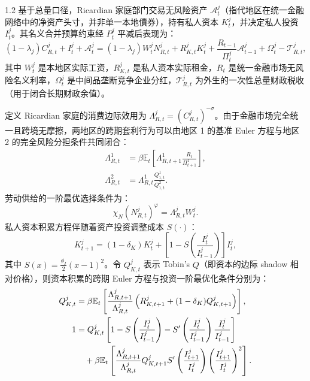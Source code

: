 \documentclass[12pt,UTF8]{ctexart}
\newcommand{\E}{\mathbb{E}}
\begin{document}
\begin{spacing}{1.2}
		基于总量口径，Ricardian 家庭部门交易无风险资产 $\mathcal A_t^j$（指代地区在统一金融网络中的净资产头寸，并非单一本地債券），持有私人资本 $K_t^j$，并决定私人投资 $I_t^j$。其名义合并预算约束经 $P_t^j$ 平减后表现为：
		\begin{equation}
			(1-\lambda_j)C_{R,t}^j+I_t^j+\mathcal A_t^j
			=
			(1-\lambda_j)W_t^jN_{R,t}^j+R_{K,t}^jK_t^j
			+\frac{R_{t-1}}{\Pi_t^j}\mathcal A_{t-1}^j
			+\Omega_t^j-\mathcal T_{R,t}^j,
			\label{eq:budget_R}
		\end{equation}
		其中 $W_t^j$ 是本地区实际工资，$R_{K,t}^j$ 是私人资本实际租金，$R_t$ 是统一金融市场无风险名义利率，$\Omega_t^j$ 是中间品垄断竞争企业分红，$\mathcal T_{R,t}^j$ 为外生的一次性总量财政税收（用于闭合长期财政余值）。
		
		定义 Ricardian 家庭的消费边际效用为 $\Lambda_{R,t}^j=(C_{R,t}^j)^{-\sigma}$。由于金融市场完全统一且跨境无摩擦，两地区的跨期套利行为可以由地区 1 的基准 Euler 方程与地区 2 的完全风险分担条件共同闭合：
		\begin{align}
			\Lambda_{R,t}^1 &=\beta \E_t\left[\Lambda_{R,t+1}^1\frac{R_t}{\Pi_{t+1}^1}\right], \label{eq:euler_rf} \\
			\Lambda_{R,t}^2 &=\Lambda_{R,t}^1\frac{Q_{1,t}^1}{Q_{1,t}^2}.
			\label{eq:risk_sharing}
		\end{align}
		劳动供给的一阶最优选择条件为：
		\begin{equation}
			\chi_N(N_{R,t}^j)^{\varphi}=\Lambda_{R,t}^j W_t^j.
			\label{eq:labor_R}
		\end{equation}
		私人资本积累方程伴随着资产投资调整成本 $S(\cdot)$：
		\begin{equation}
			K_{t+1}^j=(1-\delta_K)K_t^j+
			\left[1-S\left(\frac{I_t^j}{I_{t-1}^j}\right)\right]I_t^j,
			\label{eq:K_law}
		\end{equation}
		其中 $S(x)=\frac{\phi_I}{2}(x-1)^2$。令 $Q_{K,t}^j$ 表示 Tobin's $Q$（即资本的边际 shadow 相对价格），则资本积累的跨期 Euler 方程与投资一阶最优化条件分别为：
		\begin{align}
			Q_{K,t}^j &=\beta\E_t\left[
			\frac{\Lambda_{R,t+1}^j}{\Lambda_{R,t}^j}
			\left(R_{K,t+1}^j+(1-\delta_K)Q_{K,t+1}^j\right)
			\right], \label{eq:euler_capital}\\
			1 &=Q_{K,t}^j
			\left[
			1-S\left(\frac{I_t^j}{I_{t-1}^j}\right)
			-S'\left(\frac{I_t^j}{I_{t-1}^j}\right)\frac{I_t^j}{I_{t-1}^j}
			\right] \notag \\
			&\quad +\beta\E_t\left[
			\frac{\Lambda_{R,t+1}^j}{\Lambda_{R,t}^j}
			Q_{K,t+1}^j
			S'\left(\frac{I_{t+1}^j}{I_t^j}\right)
			\left(\frac{I_{t+1}^j}{I_t^j}\right)^2
			\right].
			\label{eq:inv_foc}
		\end{align}
		

\end{spacing}
\end{document}
